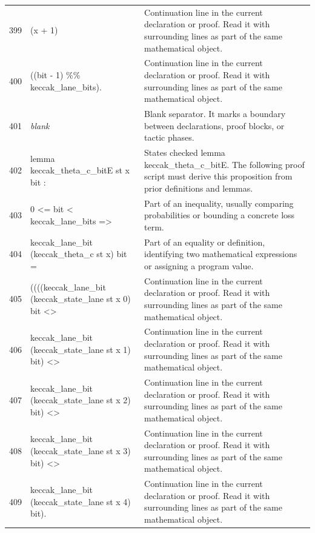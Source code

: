 \documentclass[10pt]{article}
\begin{document}
\begin{longtable}{r L{0.53\textwidth} L{0.37\textwidth}}
399 & {\ttfamily\scriptsize     (x + 1)} & Continuation line in the current declaration or proof.  Read it with surrounding lines as part of the same mathematical object. \\
400 & {\ttfamily\scriptsize     ((bit - 1) \%\% keccak\_lane\_bits).} & Continuation line in the current declaration or proof.  Read it with surrounding lines as part of the same mathematical object. \\
401 & {\ttfamily\scriptsize \emph{blank}} & Blank separator.  It marks a boundary between declarations, proof blocks, or tactic phases. \\
402 & {\ttfamily\scriptsize lemma keccak\_theta\_c\_bitE st x bit :} & States checked lemma keccak\_theta\_c\_bitE.  The following proof script must derive this proposition from prior definitions and lemmas. \\
403 & {\ttfamily\scriptsize   0 <= bit < keccak\_lane\_bits =>} & Part of an inequality, usually comparing probabilities or bounding a concrete loss term. \\
404 & {\ttfamily\scriptsize   keccak\_lane\_bit (keccak\_theta\_c st x) bit =} & Part of an equality or definition, identifying two mathematical expressions or assigning a program value. \\
405 & {\ttfamily\scriptsize   ((((keccak\_lane\_bit (keccak\_state\_lane st x 0) bit <>} & Continuation line in the current declaration or proof.  Read it with surrounding lines as part of the same mathematical object. \\
406 & {\ttfamily\scriptsize       keccak\_lane\_bit (keccak\_state\_lane st x 1) bit) <>} & Continuation line in the current declaration or proof.  Read it with surrounding lines as part of the same mathematical object. \\
407 & {\ttfamily\scriptsize      keccak\_lane\_bit (keccak\_state\_lane st x 2) bit) <>} & Continuation line in the current declaration or proof.  Read it with surrounding lines as part of the same mathematical object. \\
408 & {\ttfamily\scriptsize     keccak\_lane\_bit (keccak\_state\_lane st x 3) bit) <>} & Continuation line in the current declaration or proof.  Read it with surrounding lines as part of the same mathematical object. \\
409 & {\ttfamily\scriptsize    keccak\_lane\_bit (keccak\_state\_lane st x 4) bit).} & Continuation line in the current declaration or proof.  Read it with surrounding lines as part of the same mathematical object. \\

\end{longtable}
\end{document}
